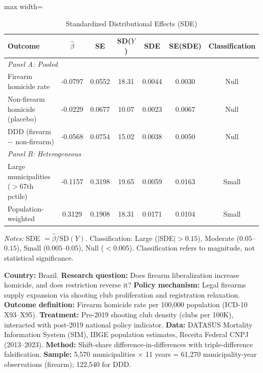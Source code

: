 
\begin{table}[t]
\centering
\caption{Standardized Distributional Effects (SDE)}
\label{tab:sde}
\begin{adjustbox}{max width=\textwidth}
\begin{tabular}{lcccccc}
\toprule
Outcome & $\hat{\beta}$ & SE & SD($Y$) & SDE & SE(SDE) & Classification \\
\midrule
\multicolumn{7}{l}{\textit{Panel A: Pooled}} \\[3pt]
Firearm homicide rate & -0.0797 & 0.0552 & 18.31 & 0.0044 & 0.0030 & Null \\
Non-firearm homicide (placebo) & -0.0229 & 0.0677 & 10.07 & 0.0023 & 0.0067 & Null \\
DDD (firearm $-$ non-firearm) & -0.0568 & 0.0754 & 15.02 & 0.0038 & 0.0050 & Null \\[6pt]
\multicolumn{7}{l}{\textit{Panel B: Heterogeneous}} \\[3pt]
Large municipalities ($>$67th pctile) & -0.1157 & 0.3198 & 19.65 & 0.0059 & 0.0163 & Small \\
Population-weighted & 0.3129 & 0.1908 & 18.31 & 0.0171 & 0.0104 & Small \\
\bottomrule
\end{tabular}
\end{adjustbox}
\begin{flushleft}\small
\textit{Notes:} SDE $= \hat{\beta} / \text{SD}(Y)$. Classification: Large ($|$SDE$| > 0.15$), Moderate ($0.05$--$0.15$), Small ($0.005$--$0.05$), Null ($< 0.005$). Classification refers to magnitude, not statistical significance.

\textbf{Country:} Brazil.
\textbf{Research question:} Does firearm liberalization increase homicide, and does restriction reverse it?
\textbf{Policy mechanism:} Legal firearms supply expansion via shooting club proliferation and registration relaxation.
\textbf{Outcome definition:} Firearm homicide rate per 100,000 population (ICD-10 X93--X95).
\textbf{Treatment:} Pre-2019 shooting club density (clubs per 100K), interacted with post-2019 national policy indicator.
\textbf{Data:} DATASUS Mortality Information System (SIM), IBGE population estimates, Receita Federal CNPJ (2013--2023).
\textbf{Method:} Shift-share difference-in-differences with triple-difference falsification.
\textbf{Sample:} 5,570 municipalities $\times$ 11 years = 61,270 municipality-year observations (firearm); 122,540 for DDD.
\end{flushleft}
\end{table}

